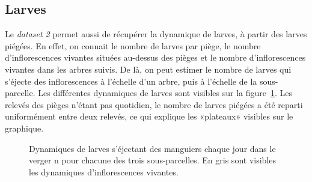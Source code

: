 \subsection{Larves}

Le \emph{dataset 2} permet aussi de récupérer la dynamique de larves, à partir des larves piégées.
En effet, on connait le nombre de larves par piège, le nombre d'inflorescences vivantes situées au-dessus des pièges et le nombre d'inflorescences vivantes dans les arbres suivis.
De là, on peut estimer le nombre de larves qui s'éjecte des inflorescences à l'échelle d'un arbre, puis à l'échelle de la sous-parcelle.
Les différentes dynamiques de larves sont visibles sur la figure~\ref{fig:larves}.
Les relevés des pièges n'étant pas quotidien, le nombre de larves piégées a été reparti uniformément entre deux relevés, ce qui explique les «plateaux» visibles sur le graphique.
\begin{figure}[ht]
\centering
{}
\caption{Dynamiques de larves s'éjectant des manguiers chaque jour dans le verger n pour chacune des trois sous-parcelles. En gris sont visibles les dynamiques d'inflorescences vivantes.}
\label{fig:larves}
\end{figure}


